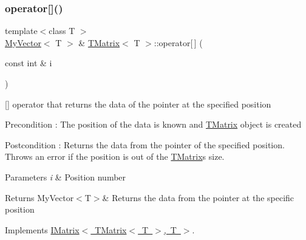 \subsubsection{\texorpdfstring{operator[]()}{operator[]()}\hspace{0.1cm}{\footnotesize\ttfamily [1/2]}}
{\footnotesize\ttfamily template$<$class T $>$ \\
\mbox{\hyperlink{class_my_vector}{My\+Vector}}$<$ T $>$ \& \mbox{\hyperlink{class_t_matrix}{T\+Matrix}}$<$ T $>$\+::operator\mbox{[}$\,$\mbox{]} (\begin{DoxyParamCaption}\item[{const int \&}]{i }\end{DoxyParamCaption})\hspace{0.3cm}{\ttfamily [virtual]}}



\mbox{[}\mbox{]} operator that returns the data of the pointer at the specified position 

\begin{DoxyPrecond}{Precondition}
\+: The position of the data is known and \mbox{\hyperlink{class_t_matrix}{T\+Matrix}} object is created 
\end{DoxyPrecond}
\begin{DoxyPostcond}{Postcondition}
\+: Returns the data from the pointer of the specified position. Throws an error if the position is out of the \mbox{\hyperlink{class_t_matrix}{T\+Matrix}}\textquotesingle{}s size. 
\end{DoxyPostcond}

\begin{DoxyParams}{Parameters}
{\em i} & Position number \\
\hline
\end{DoxyParams}
\begin{DoxyReturn}{Returns}
My\+Vector$<$\+T$>$\& Returns the data from the pointer at the specific position 
\end{DoxyReturn}


Implements \mbox{\hyperlink{class_i_matrix_a3cfb2490e2849c6c19c1979066a64818}{I\+Matrix$<$ T\+Matrix$<$ T $>$, T $>$}}.

\mbox{\label{class_t_matrix_a93ab7e799762304bf16da08c30edd413}} 
